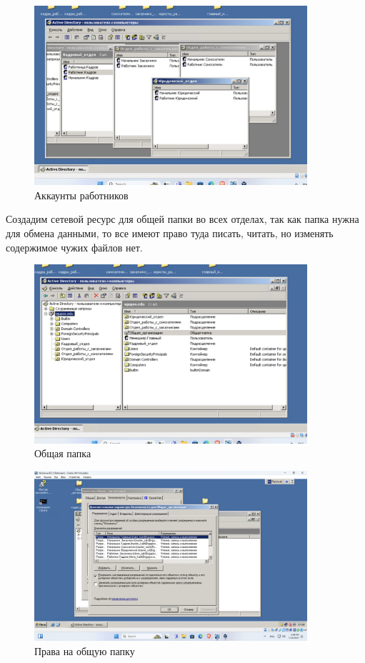 \begin{figure}[H]
  \centering
  \includegraphics[width=0.9\textwidth]{pict/prac/4}
  \caption{Аккаунты работников}
  \label{fig:15}
\end{figure}

Создадим сетевой ресурс для общей папки во всех отделах, так как папка нужна для обмена данными, то 
все имеют право туда писать, читать, но изменять содержимое чужих файлов нет.

\begin{figure}[H]
  \centering
  \includegraphics[width=0.9\textwidth]{pict/prac/5}
  \caption{Общая папка}
  \label{fig:16}
\end{figure}

\begin{figure}[H]
  \centering
  \includegraphics[width=0.9\textwidth]{pict/prac/6}
  \caption{Права на общую папку}
  \label{fig:17}
\end{figure}



